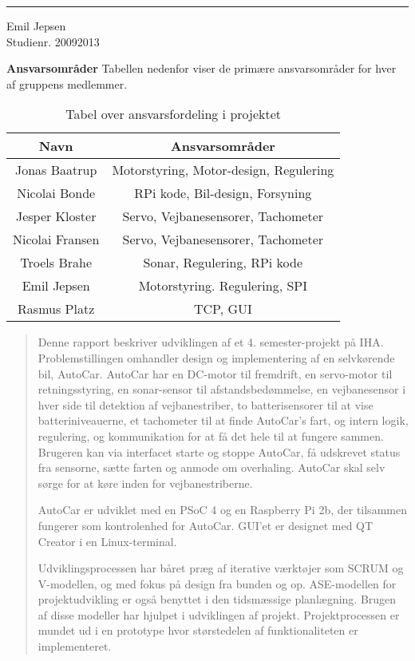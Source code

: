 \documentclass[11pt, a4paper, twoside, openany]{memoir}
\begin{document}
\begin{titlingpage}
\begin{center}
				\begin{minipage}{0.25\linewidth}
					\centering
					\hrule
					\vspace{12pt}
					Emil Jepsen\\
					Studienr. 20092013
				\end{minipage}
		\end{center}
\clearpage
			\noindent\textbf{Ansvarsområder}
Tabellen nedenfor viser de primære ansvarsområder for hver af gruppens medlemmer.
			\begin{table}[H]
				\centering
				\begin{tabular}{| c | c |}
					\hline
					\bfseries Navn & \bfseries Ansvarsområder \\ \hline
					Jonas Baatrup & Motorstyring, Motor-design, Regulering\\ \hline
					Nicolai Bonde &  RPi kode, Bil-design, Forsyning\\ \hline
					Jesper Kloster &  Servo, Vejbanesensorer, Tachometer\\ \hline
					Nicolai Fransen &  Servo, Vejbanesensorer, Tachometer\\ \hline
					Troels Brahe &  Sonar, Regulering, RPi kode\\ \hline
					Emil Jepsen &  Motorstyring. Regulering, SPI\\ \hline
					Rasmus Platz & TCP, GUI  \\ \hline
				\end{tabular}
				\caption*{Tabel over ansvarsfordeling i projektet}
			\end{table}
		\end{titlingpage}
		
		\begin{abstract}
			Denne rapport beskriver udviklingen af et 4. semester-projekt på IHA. Problemstillingen omhandler design og implementering af en selvkørende bil, AutoCar. Auto\-Car har en DC-motor til fremdrift, en servo-motor til retningsstyring, en sonar-sensor til afstandsbedømmelse, en vejbanesensor i hver side til detektion af vejbanestriber, to batterisensorer til at vise batteriniveauerne, et tachometer til at finde AutoCar's fart, og intern logik, regulering, og kommunikation for at få det hele til at fungere sammen. 
			Brugeren kan via interfacet starte og stoppe AutoCar, få udskrevet status fra sensorne, sætte farten og anmode om overhaling. AutoCar skal selv sørge for at køre inden for vejbanestriberne.
			
			AutoCar er udviklet med en PSoC 4 og en Raspberry Pi 2b, der tilsammen fungerer som kontrolenhed for AutoCar. GUI'et er designet med QT Creator i en Linux-terminal.
			
			Udviklingsprocessen har båret præg af iterative værktøjer som SCRUM og V-modellen, og med fokus på design fra bunden og op. ASE-modellen for projektudvikling er også benyttet i den tidsmæssige planlægning. Brugen af disse modeller har hjulpet i udviklingen af projekt. Projektprocessen er mundet ud i en prototype hvor størstedelen af funktionaliteten er implementeret.
			
		\end{abstract}
		
\end{document}
